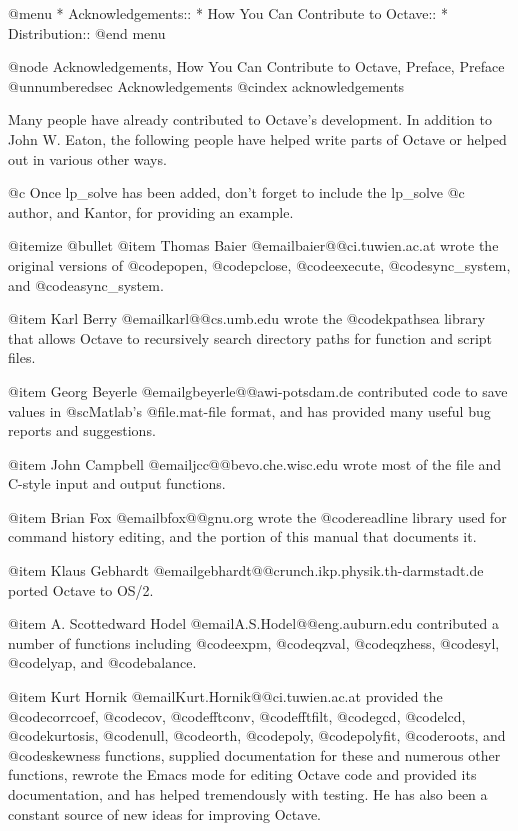 @menu
* Acknowledgements::            
* How You Can Contribute to Octave::  
* Distribution::                
@end menu

@node Acknowledgements, How You Can Contribute to Octave, Preface, Preface
@unnumberedsec Acknowledgements
@cindex acknowledgements

Many people have already contributed to Octave's development.  In
addition to John W. Eaton, the following people have helped write parts
of Octave or helped out in various other ways.

@c Once lp_solve has been added, don't forget to include the lp_solve
@c author, and Kantor, for providing an example.

@itemize @bullet
@item
Thomas Baier @email{baier@@ci.tuwien.ac.at} wrote the original versions
of @code{popen}, @code{pclose}, @code{execute}, @code{sync_system}, and
@code{async_system}.

@item
Karl Berry @email{karl@@cs.umb.edu} wrote the @code{kpathsea} library
that allows Octave to recursively search directory paths for function
and script files.

@item
Georg Beyerle @email{gbeyerle@@awi-potsdam.de} contributed code to save
values in @sc{Matlab}'s @file{.mat}-file format, and has provided many
useful bug reports and suggestions.

@item
John Campbell @email{jcc@@bevo.che.wisc.edu} wrote most of the file and
C-style input and output functions.

@item
Brian Fox @email{bfox@@gnu.org} wrote the @code{readline} library
used for command history editing, and the portion of this manual that
documents it.

@item
Klaus Gebhardt @email{gebhardt@@crunch.ikp.physik.th-darmstadt.de}
ported Octave to OS/2.

@item
A. Scottedward Hodel @email{A.S.Hodel@@eng.auburn.edu} contributed a number
of functions including @code{expm}, @code{qzval}, @code{qzhess},
@code{syl}, @code{lyap}, and @code{balance}.

@item
Kurt Hornik @email{Kurt.Hornik@@ci.tuwien.ac.at} provided the
@code{corrcoef}, @code{cov}, @code{fftconv}, @code{fftfilt}, @code{gcd},
@code{lcd}, @code{kurtosis}, @code{null}, @code{orth}, @code{poly},
@code{polyfit}, @code{roots}, and @code{skewness} functions, supplied
documentation for these and numerous other functions, rewrote the Emacs
mode for editing Octave code and provided its documentation, and has
helped tremendously with testing.  He has also been a constant source of
new ideas for improving Octave.

